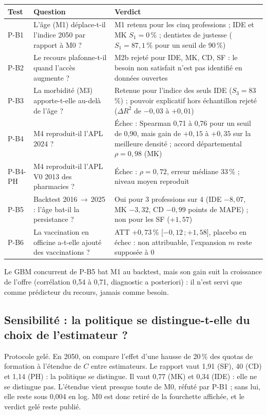 \begin{center}\small
\begin{tabularx}{\linewidth}{@{}l X X@{}}
\toprule
\textbf{Test} & \textbf{Question} & \textbf{Verdict} \\
\midrule
P-B1 & L'âge (M1) déplace-t-il l'indice 2050 par rapport à M0 ? & M1 retenu pour les cinq professions ; IDE et MK
$S_1=0$\,\%\mesure{} ; dentistes de justesse ($S_1=87{,}1$\,\%\mesure{} pour un seuil de 90\,\%) \\
P-B2 & Le recours plafonne-t-il quand l'accès augmente ? & M2b rejeté pour IDE, MK, CD, SF : le besoin non
satisfait n'est pas identifié en données ouvertes \\
P-B3 & La morbidité (M3) apporte-t-elle au-delà de l'âge ? & Retenue pour l'indice des seuls IDE
($S_3=83$\,\%\mesure{}) ; pouvoir explicatif hors échantillon rejeté ($\Delta R^2$ de $-0{,}03$ à
$+0{,}01$\mesure{}) \\
P-B4 & M4 reproduit-il l'APL 2024 ? & Échec : Spearman 0,71 à 0,76\mesure{} pour un seuil de 0,90, mais gain de
$+0{,}15$ à $+0{,}35$\mesure{} sur la meilleure densité ; accord départemental $\rho=0{,}98$\mesure{} (MK) \\
P-B4-PH & M4 reproduit-il l'APL V0 2013 des pharmacies ? & Échec : $\rho=0{,}72$\mesure{}, erreur médiane
33\,\%\mesure{} ; niveau moyen reproduit \\
P-B5 & Backtest 2016\,$\to$\,2025 : l'âge bat-il la persistance ? & Oui pour 3 professions sur 4 (IDE
$-8{,}07$, MK $-3{,}32$, CD $-0{,}99$ points de MAPE\mesure{}) ; non pour les SF ($+1{,}57$\mesure{}) \\
P-B6 & La vaccination en officine a-t-elle ajouté des vaccinations ? & ATT $+0{,}73$\,\%
[$-0{,}12$\,;\,$+1{,}58$]\mesure{}, placebo en échec : non attribuable, l'expansion $m$ reste supposée à 0 \\
\bottomrule
\end{tabularx}
\end{center}

Le GBM concurrent de P-B5 bat M1 au backtest, mais son gain suit la croissance de l'offre (corrélation 0,54 à 0,71,
diagnostic a posteriori) : il n'est servi que comme prédicteur du recours, jamais comme besoin.

\subsection{Sensibilité : la politique se distingue-t-elle du choix de l'estimateur ?}\label{bes:sensibilite}
Protocole gelé. En 2050, on compare l'effet d'une hausse de 20\,\% des quotas de formation à l'étendue de $C$ entre
estimateurs. Le rapport vaut 1,91\mesure{} (SF), 40\mesure{} (CD) et 1,14\mesure{} (PH) : la politique se
distingue. Il vaut 0,77\mesure{} (MK) et 0,34\mesure{} (IDE) : elle ne se distingue pas. L'étendue vient presque
toute de M0, réfuté par P-B1 ; sans lui, elle reste sous 0,004 en log\mesure{}. M0 est donc retiré de la fourchette
affichée, et le verdict gelé reste publié.

